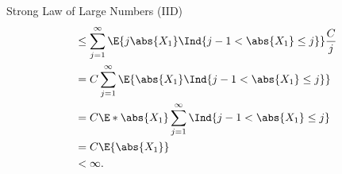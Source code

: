 \begin{Theorem}{Strong Law of Large Numbers (IID)}{}
\begin{align*}
         & \le \sum_{j=1}^{\infty}\E{j\abs{X_1}\Ind{j-1<\abs{X_1}\le j}}\frac{C}{j}                                       \\
         & =C\sum_{j=1}^{\infty}\E{\abs{X_1}\Ind{j-1<\abs{X_1}\le j}}                                                     \\
         & =C\E*{\abs{X_1}\sum_{j=1}^{\infty}\Ind{j-1<\abs{X_1}\le j}}                                                    \\
         & =C\E{\abs{X_1}}                                                                                                \\
         & <\infty.
    \end{align*}
\end{Theorem}